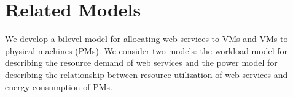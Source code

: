 





\section{Related Models}
We develop a bilevel model for allocating web services to VMs and VMs to physical machines (PMs). We consider two models: the workload model for describing the resource demand of web services and the power model for describing the relationship between resource utilization of web services and energy consumption of PMs.


